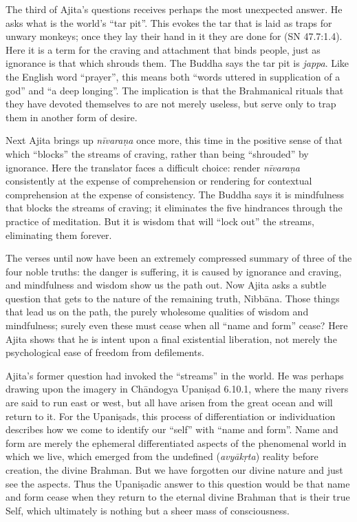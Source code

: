 \documentclass[12pt,openany]{book}%
\begin{document}
The third of Ajita’s questions receives perhaps the most unexpected answer. He asks what is the world’s “tar pit”. This evokes the tar that is laid as traps for unwary monkeys; once they lay their hand in it they are done for (SN 47.7:1.4). Here it is a term for the craving and attachment that binds people, just as ignorance is that which shrouds them. The Buddha says the tar pit is \textit{jappa}. Like the English word “prayer”, this means both “words uttered in supplication of a god” and “a deep longing”. The implication is that the Brahmanical rituals that they have devoted themselves to are not merely useless, but serve only to trap them in another form of desire.

Next Ajita brings up \textit{\textsanskrit{nīvaraṇa}} once more, this time in the positive sense of that which “blocks” the streams of craving, rather than being “shrouded” by ignorance. Here the translator faces a difficult choice: render \textit{\textsanskrit{nīvaraṇa}} consistently at the expense of comprehension or rendering for contextual comprehension at the expense of consistency. The Buddha says it is mindfulness that blocks the streams of craving; it eliminates the five hindrances through the practice of meditation. But it is wisdom that will “lock out” the streams, eliminating them forever.

The verses until now have been an extremely compressed summary of three of the four noble truths: the danger is suffering, it is caused by ignorance and craving, and mindfulness and wisdom show us the path out. Now Ajita asks a subtle question that gets to the nature of the remaining truth, \textsanskrit{Nibbāna}. Those things that lead us on the path, the purely wholesome qualities of wisdom and mindfulness; surely even these must cease when all “name and form” cease? Here Ajita shows that he is intent upon a final existential liberation, not merely the psychological ease of freedom from defilements.

Ajita’s former question had invoked the “streams” in the world. He was perhaps drawing upon the imagery in \textsanskrit{Chāndogya} \textsanskrit{Upaniṣad} 6.10.1, where the many rivers are said to run east or west, but all have arisen from the great ocean and will return to it. For the \textsanskrit{Upaniṣads}, this process of differentiation or individuation describes how we come to identify our “self” with “name and form”. Name and form are merely the ephemeral differentiated aspects of the phenomenal world in which we live, which emerged from the undefined (\textit{\textsanskrit{avyākṛta}}) reality before creation, the divine Brahman. But we have forgotten our divine nature and just see the aspects. Thus the \textsanskrit{Upaniṣadic} answer to this question would be that name and form cease when they return to the eternal divine Brahman that is their true Self, which ultimately is nothing but a sheer mass of consciousness.
\end{document}
